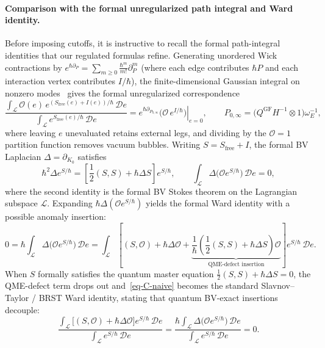 \documentclass[11pt]{article}
\numberwithin{equation}{section}
\numberwithin{figure}{section}
\numberwithin{table}{section}
\begin{document}
\paragraph{Comparison with the formal unregularized path integral and Ward identity.}
Before imposing cutoffs, it is instructive to recall the formal path-integral identities that our regulated formulas refine. Generating unordered Wick contractions by $e^{\hbar\partial_P}=\sum_{m\ge0}\frac{\hbar^m}{m!}\partial_P^m$ (where each edge contributes $\hbar P$ and each interaction vertex contributes $I/\hbar$), the finite-dimensional Gaussian integral on nonzero modes~\cite[Section 6.6]{CostelloBV} gives the formal unregularized correspondence
\begin{equation}\label{eq-C-Gaussian-Wick}
\frac{\displaystyle\int_{\mathcal L}\mathcal O(e)\,
 e^{(S_{\mathrm{free}}(e)+I(e))/\hbar}\,\mathcal D e}
 {\displaystyle\int_{\mathcal L}e^{S_{\mathrm{free}}(e)/\hbar}\,\mathcal D e}
=\left.e^{\hbar\partial_{P_{0,\infty}}}
 \bigl(\mathcal O\,e^{I/\hbar}\bigr)\right|_{e=0},
\qquad
P_{0,\infty}=\bigl(Q^{\mathrm{GF}}H^{-1}\otimes1\bigr)\omega_E^{-1},
\end{equation}
where leaving $e$ unevaluated retains external legs, and dividing by the $\mathcal O=1$ partition function removes vacuum bubbles. Writing $S=S_{\mathrm{free}}+I$, the formal BV Laplacian $\Delta=\partial_{K_0}$ satisfies
\begin{equation}\label{eq-C-formal-QME}
\hbar^2\Delta e^{S/\hbar}
=\left[\frac12(S,S)+\hbar\Delta S\right]e^{S/\hbar},\qquad
\int_{\mathcal L}\Delta\bigl(\mathcal O e^{S/\hbar}\bigr)\,\mathcal D e=0,
\end{equation}
where the second identity is the formal BV Stokes theorem on the Lagrangian subspace $\mathcal L$. Expanding $\hbar\Delta(\mathcal O e^{S/\hbar})$ yields the formal Ward identity with a possible anomaly insertion:
\begin{equation}\label{eq-C-naive}
0=\hbar\int_{\mathcal L}\Delta\bigl(\mathcal O e^{S/\hbar}\bigr)\,\mathcal D e
=\int_{\mathcal L}\left[
 (S,\mathcal O)+\hbar\Delta\mathcal O
 +\underbrace{\frac1\hbar\left(\frac12(S,S)+\hbar\Delta S\right)\mathcal O}_{\text{QME-defect insertion}}
\right]e^{S/\hbar}\,\mathcal D e.
\end{equation}
When $S$ formally satisfies the quantum master equation $\frac12(S,S)+\hbar\Delta S=0$, the QME-defect term drops out and~\eqref{eq-C-naive} becomes the standard Slavnov--Taylor / BRST Ward identity, stating that quantum BV-exact insertions decouple:
\begin{equation}\label{eq-C-formal-Ward}
\frac{\displaystyle\int_{\mathcal L}
 \bigl[(S,\mathcal O)+\hbar\Delta\mathcal O\bigr]e^{S/\hbar}\,\mathcal D e}
 {\displaystyle\int_{\mathcal L}e^{S/\hbar}\,\mathcal D e}
=\frac{\displaystyle\hbar\int_{\mathcal L}
 \Delta\bigl(\mathcal O e^{S/\hbar}\bigr)\,\mathcal D e}
 {\displaystyle\int_{\mathcal L}e^{S/\hbar}\,\mathcal D e}=0.
\end{equation}
\end{document}
